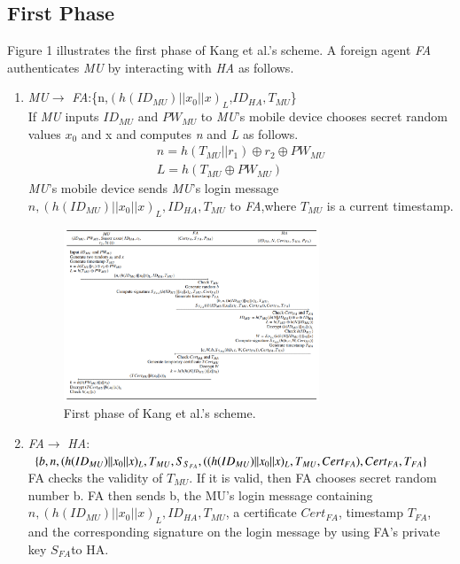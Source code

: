 \documentclass[letter]{ieice}%
\begin{document}
\subsection{First Phase}
Figure 1 illustrates the first phase of Kang et al.’s scheme. A foreign agent \emph{FA} authenticates \emph{MU} by interacting with \emph{HA} as follows.
\begin{enumerate}
\item \emph{MU}$\rightarrow$ \emph{FA}:\{n,$(h({ID}_{MU})||{x_0}||x)_L$,${ID}_{HA},T_{MU}$\}\\%
    If \emph{MU} inputs \emph{${ID}_{MU}$} and \emph{${PW}_{MU}$} to \emph{MU}'s mobile device chooses secret random values $x_0$ and x and computes \emph{n} and \emph{L} as follows.
    \begin{eqnarray}
    n=h(T_{MU} ||r_1)\oplus r_2 \oplus {PW}_{MU}\\
    L=h(T_{MU}\oplus PW_{MU})
     \end{eqnarray}
     \emph{MU}'s mobile device sends \emph{MU}'s login message ${n,(h({ID}_{MU})||x_0||x)_L,{ID}_{HA},T_{MU}}$ to \emph{FA},where \emph{$T_{MU}$} is a current timestamp.
    \begin{figure}[htbp]
    \centering
    \includegraphics[width=3in]{Fig//figure.png}%
    \caption{First phase of Kang et al.'s scheme.}
    \end{figure}
\item \emph{FA}$\rightarrow$ \emph{HA}: 
$\{b,n,(h({ID}_{MU})||x_0||x)_L,T_{MU},{S}_{S_{FA}}, ((h({ID}_{MU}) \\ ||x_0||x)_L,T_{MU},{Cert}_{FA}
),{Cert}_{FA},T_{FA}\}$\\
    FA checks the validity of $T_{MU}$. If it is valid, then FA chooses secret random number b. FA
    then sends b, the MU’s login message containing ${n,(h({ID}_{MU})||x_0||x)_L,{ID}_{HA}, T_{MU}}$, a certificate $Cert_{FA}$, timestamp $T_{FA}$, and the corresponding signature on the
    login message by using FA’s private key $S_{FA}$to HA.

\end{enumerate}
\end{document}
